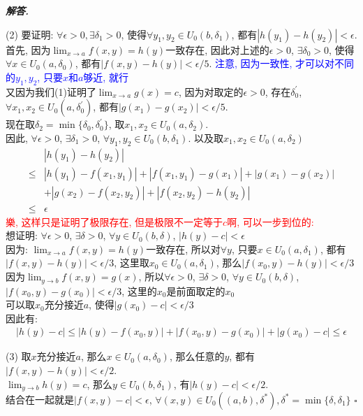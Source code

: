 \documentclass[10pt, a4paper, oneside]{ctexart}
\newenvironment{solution}{%
  \par\noindent\textbf{\textit{解答. }}\ignorespaces
}{%
  \hfill\ensuremath{\square}\par %
}
\begin{document}
\begin{solution}
(2) 要证明: $\forall \epsilon>0, \exists \delta_1>0$, 使得$\forall y_1,y_2 \in U_0(b,\delta_1)$, 都有$|h(y_1)-h(y_2) |<\epsilon $.\\
首先, 因为$\lim_{x\to a}f(x,y)=h(y)$一致存在, 因此对上述的$\epsilon>0$, $\exists \delta_0>0$, 使得$\forall x\in U_0(a,\delta_0)$, 都有$|f(x,y)-h(y) |<\epsilon/5$. \textcolor{blue}{注意, 因为一致性, 才可以对不同的$y_1,y_2$, 只要$x$和$a$够近, 就行}\\
又因为我们(1)证明了$\lim_{x\to a}g(x)=c$, 因为对取定的$\epsilon>0$, 存在$\delta_0^{\prime}$, $\forall x_1,x_2\in U_0(a,\delta_0^{\prime})$, 都有$|g(x_1)-g(x_2) |<\epsilon/5$.\\
现在取$\delta_2 = \min\{\delta_0, \delta_0^{\prime}\}$, 取$x_1,x_2\in U_0(a,\delta_2)$.\\
因此, $\forall \epsilon>0$, $\exists \delta_1>0$, $\forall y_1,y_2\in U_0(b,\delta_1)$. 以及取$x_1,x_2\in U_0(a,\delta_2)$
\begin{align*}
    &|h(y_1)-h(y_2) |\\
    \leq& |h(y_1)-f(x_1,y_1) |+|f(x_1,y_1)-g(x_1) |+|g(x_1)-g(x_2)| \\&+ |g(x_2)-f(x_2,y_2)| + |f(x_2,y_2)-h(y_2)|\\
    \leq &\epsilon
\end{align*} 
\textcolor{red}{樂, 这样只是证明了极限存在, 但是极限不一定等于$c$啊, 可以一步到位的:}\\
想证明: $\forall \epsilon>0$, $\exists \delta>0$, $\forall y\in U_0(b,\delta)$, $|h(y)-c|<\epsilon $\\
因为: $\lim_{x\to a}f(x,y)=h(y)$一致存在, 所以对$\forall y$, 只要$x\in U_0(a,\delta_1)$, 都有$|f(x,y)-h(y) |<\epsilon/3$, 这里取$x_0\in U_0(a,\delta_1)$, 那么$|f(x_0,y)-h(y) |<\epsilon/3$\\ 
因为$\lim_{y\to b}f(x,y)=g(x)$, 所以$\forall \epsilon>0$, $\exists \delta>0$, $\forall y\in U_0(b,\delta)$, $|f(x_0,y)-g(x_0)|<\epsilon/3 $, 这里的$x_0$是前面取定的$x_0$\\
可以取$x_0$充分接近$a$, 使得$|g(x_0)-c|<\epsilon/3$\\
因此有:
\begin{align*}
    |h(y)-c| \leq |h(y)-f(x_0,y)| + |f(x_0,y)-g(x_0)| +|g(x_0)-c|\leq \epsilon
\end{align*}

(3) 取$x$充分接近$a$, 那么$x\in U_0(a,\delta_0)$, 那么任意的$y$, 都有$|f(x,y)-h(y)|<\epsilon/2$.\\
$\lim_{y\to b}h(y)=c$, 那么$y\in U_0(b,\delta_1)$, 有$|h(y)-c |<\epsilon/2$.\\
结合在一起就是$|f(x,y)-c |<\epsilon$, $\forall (x,y)\in U_0((a,b), \delta^*), \delta^* = \min\{\delta, \delta_1\}$
\end{solution}
\end{document}
